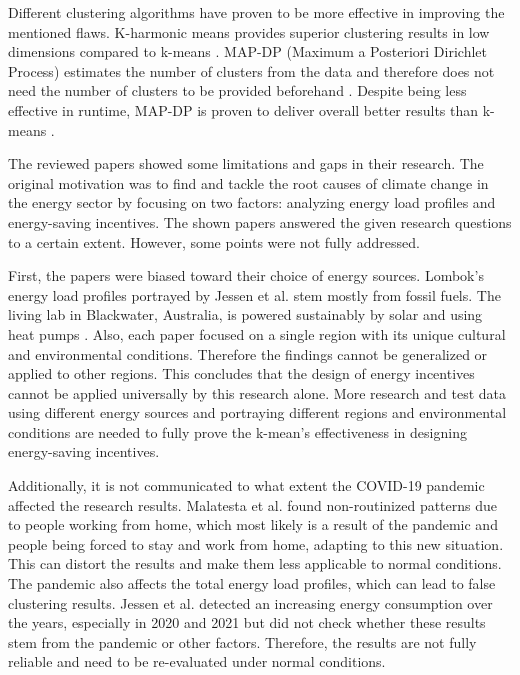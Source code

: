 Different clustering algorithms have proven to be more effective in improving the mentioned flaws.
K-harmonic means provides superior clustering results in low dimensions compared to k-means \cite{HAM-ALT}.
MAP-DP (Maximum a Posteriori Dirichlet Process) estimates the number of clusters from the data and therefore does not need the number of clusters to be provided beforehand \cite{RAY-ALT}.
Despite being less effective in runtime, MAP-DP is proven to deliver overall better results than k-means \cite{RAY-ALT}.

The reviewed papers showed some limitations and gaps in their research.
The original motivation was to find and tackle the root causes of climate change in the energy sector by focusing on two factors: analyzing energy load profiles and energy-saving incentives.
The shown papers answered the given research questions to a certain extent.
However, some points were not fully addressed.

First, the papers were biased toward their choice of energy sources.
Lombok's energy load profiles portrayed by Jessen et al. \cite{JES-IND} stem mostly from fossil fuels.
The living lab in Blackwater, Australia, is powered sustainably by solar and using heat pumps \cite{MAL-HBP}.
Also, each paper focused on a single region with its unique cultural and environmental conditions.
Therefore the findings cannot be generalized or applied to other regions.
This concludes that the design of energy incentives cannot be applied universally by this research alone.
More research and test data using different energy sources and portraying different regions and environmental conditions are needed to fully prove the k-mean's effectiveness in designing energy-saving incentives. 

Additionally, it is not communicated to what extent the COVID-19 pandemic affected the research results.
Malatesta et al. \cite{MAL-HBP} found non-routinized patterns due to people working from home, which most likely is a result of the pandemic and people being forced to stay and work from home, adapting to this new situation.
This can distort the results and make them less applicable to normal conditions.
The pandemic also affects the total energy load profiles, which can lead to false clustering results.
Jessen et al. \cite{JES-IND} detected an increasing energy consumption over the years, especially in 2020 and 2021 but did not check whether these results stem from the pandemic or other factors.
Therefore, the results are not fully reliable and need to be re-evaluated under normal conditions.

